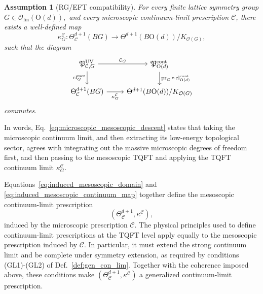 \documentclass[aps,prx,reprint,superscriptaddress,twocolumn,amsmath,amssymb,amsfonts, nofootinbib]{revtex4-2}
\newcommand{\ofin}{\mathcal{O}_{\text{fin}}}
\theoremstyle{apsstyle}
\newtheorem{assumption}{Assumption}
\begin{document}
\begin{assumption}[RG/EFT compatibility]
\label{assumption:RG_EFT_compatibility}
For every finite lattice symmetry group
$G\in\ofin(\mathrm{O}(d)),$ and every microscopic continuum-limit
prescription $\mathcal C$, there exists a well-defined map
\begin{equation}
\kappa_G^{\mathcal C}:
\Theta_{\mathcal C}^{d+1}(BG)
\longrightarrow
\Theta^{d+1}(B\mathrm{O}(d))/K_{\mathcal O(G)},
\label{eq:induced_mesoscopic_continuum_map}
\end{equation}
such that the diagram
\begin{equation}
\label{eq:microscopic_mesoscopic_descent}
\begin{tikzcd}
\mathfrak P_{\mathcal C,G}^{\mathrm{UV}}
\arrow[r,"\mathcal C_G"]
\arrow[d,"\operatorname{cl}^{\mathrm{mes}}_G"']
&
\mathfrak P_{\mathrm{O}(d)}^{\mathrm{cont}}
\arrow[d,"\operatorname{pr}_G\circ
\operatorname{cl}^{\mathrm{cont}}_{\mathrm{O}(d)}"]
\\
\Theta_{\mathcal C}^{d+1}(BG)
\arrow[r,"\kappa_G^{\mathcal C}"']
&
\Theta^{d+1}(B\mathrm{O}(d))/K_{\mathcal O(G)}
\end{tikzcd}
\end{equation}
commutes.
\end{assumption}

\medskip 
In words, Eq.~\eqref{eq:microscopic_mesoscopic_descent} states that taking the microscopic continuum limit, and then extracting its low-energy topological sector, agrees with integrating out the massive microscopic degrees of freedom first, and then passing to the mesoscopic TQFT and applying the TQFT continuum limit $\kappa_G^{\mathcal C}$.


Equations~\eqref{eq:induced_mesoscopic_domain} and \eqref{eq:induced_mesoscopic_continuum_map} together define the mesoscopic continuum-limit prescription
\begin{equation*}
\left( \Theta_{\mathcal C}^{d+1}, \kappa^{\mathcal C} \right),
\end{equation*}
induced by the microscopic prescription $\mathcal C$. The physical principles used to define continuum-limit prescriptions at the TQFT level apply equally to the mesoscopic prescription induced by $\mathcal C$. In particular, it must extend the strong continuum limit and be complete under symmetry extension, as required by conditions {\rm(GL1)}-{\rm(GL2)} of Def.~\ref{def:gen_con_lim}. Together with the coherence imposed above, these conditions make $\left(\Theta_{\mathcal C}^{d+1},\kappa^{\mathcal C}\right)$ a generalized continuum-limit prescription. 
\end{document}
